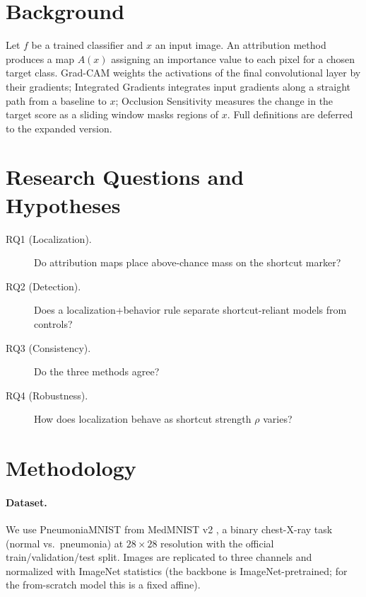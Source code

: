 \documentclass[11pt]{article}
\begin{document}
\section{Background}
\label{sec:background}
Let $f$ be a trained classifier and $x$ an input image. An attribution method produces a map
$A(x)$ assigning an importance value to each pixel for a chosen target class. Grad-CAM weights the
activations of the final convolutional layer by their gradients; Integrated Gradients integrates
input gradients along a straight path from a baseline to $x$; Occlusion Sensitivity measures the
change in the target score as a sliding window masks regions of $x$. Full definitions are deferred
to the expanded version.

\section{Research Questions and Hypotheses}
\label{sec:rq}
\begin{description}
  \item[RQ1 (Localization).] Do attribution maps place above-chance mass on the shortcut marker?
  \item[RQ2 (Detection).] Does a localization+behavior rule separate shortcut-reliant models from controls?
  \item[RQ3 (Consistency).] Do the three methods agree?
  \item[RQ4 (Robustness).] How does localization behave as shortcut strength $\rho$ varies?
\end{description}

\section{Methodology}
\label{sec:method}

\paragraph{Dataset.} We use PneumoniaMNIST from MedMNIST v2 \citep{yang2023medmnist}, a binary
chest-X-ray task (normal vs.\ pneumonia) at $28\times28$ resolution with the official
train/validation/test split. Images are replicated to three channels and normalized with ImageNet
statistics (the backbone is ImageNet-pretrained; for the from-scratch model this is a fixed affine).
\end{document}

